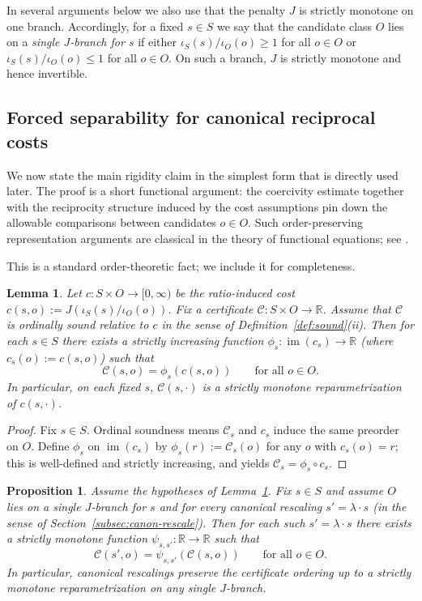 \documentclass[11pt,reqno]{amsart}
\newtheorem{proposition}[theorem]{Proposition}
\newtheorem{lemma}[theorem]{Lemma}
\theoremstyle{definition}
\theoremstyle{remark}
\newcommand{\R}{\mathbb{R}}
\newcommand{\1}{\mathbf{1}}
\begin{document}
In several arguments below we also use that the penalty $J$ is strictly monotone on one branch.
Accordingly, for a fixed $s\in S$ we say that the candidate class $O$ lies on a \emph{single $J$-branch for $s$} if either
$\iota_S(s)/\iota_O(o)\ge 1$ for all $o\in O$ or $\iota_S(s)/\iota_O(o)\le 1$ for all $o\in O$.
On such a branch, $J$ is strictly monotone and hence invertible.

\subsection{Forced separability for canonical reciprocal costs}

We now state the main rigidity claim in the simplest form that is directly used
later. The proof is a short functional argument: the coercivity estimate together with the reciprocity structure induced by the cost assumptions pin down the allowable comparisons between candidates $o\in O$.
Such order-preserving representation arguments are classical in the theory of functional equations; see \cite{aczel1966}.


\noindent This is a standard order-theoretic fact; we include it for completeness.
\begin{lemma}\label{lem:forced-factor}
Let $c:S\times O\to[0,\infty)$ be the ratio-induced cost $c(s,o):=J(\iota_S(s)/\iota_O(o))$.
Fix a certificate $\mathcal{C}:S\times O\to\R$.
Assume that $\mathcal{C}$ is \emph{ordinally sound} relative to $c$ in the sense of
Definition~\ref{def:sound}(ii).
Then for each $s\in S$ there exists a strictly increasing function
$\phi_s:\operatorname{im}(c_s)\to\R$ (where $c_s(o):=c(s,o)$) such that
\[
\mathcal{C}(s,o)=\phi_s(c(s,o))\qquad\text{for all }o\in O.
\]
In particular, on each fixed $s$, $\mathcal{C}(s,\cdot)$ is a strictly monotone reparametrization of $c(s,\cdot)$.
\end{lemma}

\begin{proof}
Fix $s\in S$. Ordinal soundness means $\mathcal{C}_s$ and $c_s$ induce the same preorder on $O$.
Define $\phi_s$ on $\operatorname{im}(c_s)$ by $\phi_s(r):=\mathcal{C}_s(o)$ for any $o$ with $c_s(o)=r$; this is well-defined and strictly increasing, and yields $\mathcal{C}_s=\phi_s\circ c_s$.
\end{proof}


\begin{proposition}\label{prop:rescale-stability}
Assume the hypotheses of Lemma~\ref{lem:forced-factor}.
Fix $s\in S$ and assume $O$ lies on a single $J$-branch for $s$ and for every canonical rescaling $s'=\lambda\cdot s$
(in the sense of Section~\ref{subsec:canon-rescale}).
Then for each such $s'=\lambda\cdot s$ there exists a strictly monotone function $\psi_{s,s'}:\R\to\R$ such that
\[
\mathcal{C}(s',o)=\psi_{s,s'}(\mathcal{C}(s,o))\qquad\text{for all }o\in O.
\]
In particular, canonical rescalings preserve the certificate ordering up to a strictly monotone reparametrization on any single $J$-branch.
\end{proposition}
\end{document}
